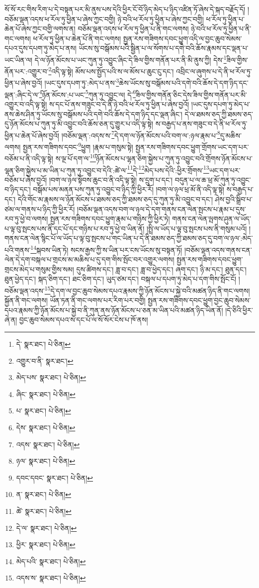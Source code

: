 སོ་སོ་རང་གིས་རིག་པ་དེ་བསྟན་པར་མི་ནུས་པས་དེའི་ཕྱིར་ངོ་བོ་ཉིད་མེད་པ་ཉིད་འཛིན་ཏོ་ཞེས་དེ་སྐད་བརྗོད་དོ། །བཅོམ་ལྡན་འདས་ཕ་རོལ་ཏུ་ཕྱིན་པ་ཞེས་ཀྱང་བགྱི། ཉེ་བའི་ཕ་རོལ་ཏུ་ཕྱིན་པ་ཞེས་ཀྱང་བགྱི། ཕ་རོལ་ཏུ་ཕྱིན་པ་ཆེན་པོ་ཞེས་ཀྱང་བགྱི་ལགས་ན། བཅོམ་ལྡན་འདས་ཕ་རོལ་ཏུ་ཕྱིན་པ་ནི་གང་ལགས། ཉེ་བའི་ཕ་རོལ་ཏུ་ཕྱིན་པ་ནི་གང་ལགས། ཕ་རོལ་ཏུ་ཕྱིན་པ་ཆེན་པོ་ནི་གང་ལགས། སྤྱན་རས་གཟིགས་དབང་ཕྱུག་འདི་ལ་བྱང་ཆུབ་སེམས་དཔའ་དུས་དཔག་ཏུ་མེད་པ་ནས། ཡོངས་སུ་བསྒོམས་པའི་སྦྱིན་པ་ལ་སོགས་པ་དགེ་བའི་ཆོས་རྣམས་དང་ལྡན་པ་ཡང་ཡིན་ལ། དེ་ལ་ཉོན་མོངས་པ་ཡང་ཀུན་ཏུ་འབྱུང་ཞིང་དེ་ཟིལ་གྱིས་གནོན་པར་ནི་མི་ནུས་ཀྱི། དེས་\footnote{དེ་  སྣར་ཐང་།  པེ་ཅིན། }ཟིལ་གྱིས་ནོན་པར་:འགྱུར་བ་\footnote{འགྱུར་བ་ནི་  སྣར་ཐང་། }འདི་ལྟ་སྟེ། མོས་པས་སྤྱོད་པའི་ས་ལ་མོས་པ་ཆུང་ངུ་དང་། འབྲིང་ལ་ཞུགས་པ་དེ་ནི་ཕ་རོལ་ཏུ་ཕྱིན་པ་ཞེས་བྱའོ། །ཡང་དུས་དཔག་ཏུ་:མེད་པ་ནས་\footnote{མེད་པས་  སྣར་ཐང་།  པེ་ཅིན། }ཆེས་ཡོངས་སུ་བསྒོམས་པའི་དགེ་བའི་ཆོས་དེ་དག་ཉིད་དང་ལྡན་:ཞིང་དེ་ལ་\footnote{ཞིང་  སྣར་ཐང་།  པེ་ཅིན། }ཉོན་མོངས་:པ་ཡང་\footnote{པ་  སྣར་ཐང་།  པེ་ཅིན། }ཀུན་ཏུ་འབྱུང་ལ། དེ་\footnote{དེས་  སྣར་ཐང་།  པེ་ཅིན། }ཟིལ་གྱིས་གནོན་ཅིང་དེས་ཟིལ་གྱིས་གནོན་པར་མི་འགྱུར་བ་འདི་ལྟ་སྟེ། ས་དང་པོ་ནས་གཟུང་བ་དེ་ནི་ཉེ་བའི་ཕ་རོལ་ཏུ་ཕྱིན་པ་ཞེས་བྱའོ། །ཡང་དུས་དཔག་ཏུ་མེད་པ་ནས་ཆེས་ཤིན་ཏུ་ཡོངས་སུ་བསྒོམས་པའི་དགེ་བའི་ཆོས་དེ་དག་ཉིད་དང་ལྡན་ཞིང་། དེ་ལ་ཐམས་ཅད་ཀྱི་ཐམས་ཅད་དུ་ཉོན་མོངས་པ་ཀུན་ཏུ་མི་འབྱུང་བའི་ཆོས་ཅན་དུ་གྱུར་པ་འདི་ལྟ་སྟེ། ས་བརྒྱད་པ་ནས་གཟུང་བ་དེ་ནི་ཕ་རོལ་ཏུ་ཕྱིན་པ་ཆེན་པོ་ཞེས་བྱའོ། །བཅོམ་ལྡན་:འདས་ས་\footnote{འདས་  སྣར་ཐང་།  པེ་ཅིན། }དེ་དག་ལ་ཉོན་མོངས་པའི་བག་ལ་:ཉལ་རྣམ་པ་\footnote{ཉལ་  སྣར་ཐང་།  པེ་ཅིན། }དུ་མཆིས་ལགས། སྤྱན་རས་གཟིགས་དབང་\footnote{དབང་དབང་  སྣར་ཐང་།  པེ་ཅིན། }ཕྱུག །རྣམ་པ་གསུམ་སྟེ། སྤྱན་རས་གཟིགས་དབང་ཕྱུག་གྲོགས་ཡང་དག་པར་བཅོམ་པ་ནི་འདི་ལྟ་སྟེ། ས་ལྔ་པོ་དག་ལ་\footnote{ན་  སྣར་ཐང་།  པེ་ཅིན། }ཉོན་མོངས་པ་ལྷན་ཅིག་སྐྱེས་པ་ཀུན་ཏུ་འབྱུང་བའི་གྲོགས་ཉོན་མོངས་པ་ལྷན་ཅིག་སྐྱེས་པ་མ་ཡིན་པ་ཀུན་ཏུ་འབྱུང་བ་དེའི་:ཚེ་ལ་\footnote{ཚེ་  སྣར་ཐང་།  པེ་ཅིན། }དེ་\footnote{དེ་ལ་  སྣར་ཐང་།  པེ་ཅིན། }མེད་པས་དེའི་:ཕྱིར་གྲོགས་\footnote{ཕྱིར་  སྣར་ཐང་།  པེ་ཅིན། }ཡང་དག་པར་བཅོམ་པ་ཞེས་བྱའོ། །བག་ལ་ཉལ་སྟོབས་ཆུང་བ་ནི་འདི་ལྟ་སྟེ། ས་དྲུག་པ་དང་། བདུན་པ་ལ་ཆ་ཕྲ་མོ་ཀུན་ཏུ་འབྱུང་བ་ཉིད་དང་། བསྒོམ་པས་མནན་པས་ཀུན་ཏུ་འབྱུང་བ་ཉིད་ཀྱི་ཕྱིར་རོ། །བག་ལ་ཉལ་ཕྲ་མོ་ནི་འདི་ལྟ་སྟེ། ས་བརྒྱད་པ་དང་། དེའི་གོང་མ་རྣམས་ལ་ཉོན་མོངས་པ་ཐམས་ཅད་ཀྱི་ཐམས་ཅད་དུ་ཀུན་ཏུ་མི་འབྱུང་བ་དང་། ཤེས་བྱའི་སྒྲིབ་པ་ཙམ་ལ་གནས་པ་ཉིད་ཀྱི་ཕྱིར་རོ། །བཅོམ་ལྡན་འདས་བག་ལ་ཉལ་དེ་དག་གནས་ངན་ལེན་སྤངས་པ་རྣམ་པ་དུས་རབ་ཏུ་ཕྱེ་བ་ལགས། སྤྱན་རས་གཟིགས་དབང་ཕྱུག་རྣམ་པ་གཉིས་ཀྱི་ཕྱིར་ཏེ། གནས་ངན་ལེན་ལྤགས་ཤུན་ལ་ཡོད་པ་ལྟ་བུ་སྤངས་པས་ནི་དང་པོ་དང་གཉིས་པ་རབ་ཏུ་ཕྱེ་བ་ཡིན་ནོ། །སྤྲི་ལ་ཡོད་པ་ལྟ་བུ་སྤངས་པས་ནི་གསུམ་པའོ། །གནས་ངན་ལེན་སྙིང་པོ་ལ་ཡོད་པ་ལྟ་བུ་སྤངས་པ་གང་ཡིན་པ་དེ་ནི་ཐམས་ཅད་ཀྱི་ཐམས་ཅད་དུ་བག་ལ་ཉལ་:མེད་པའི་གནས་\footnote{མེད་པའི་  སྣར་ཐང་།  པེ་ཅིན། }སྐབས་ཡིན་ཏེ། སངས་རྒྱས་ཀྱི་ས་ཡིན་པར་ངས་ཡོངས་སུ་བསྟན་ཏོ། །བཅོམ་ལྡན་འདས་གནས་ངན་ལེན་དེ་དག་བསྐལ་པ་གྲངས་མ་མཆིས་པ་དུ་དག་གིས་སྤོང་བར་འགྱུར་ལགས། སྤྱན་རས་གཟིགས་དབང་ཕྱུག་གྲངས་མེད་པ་གསུམ་གྱིས་སམ། དུས་ཚིགས་དང་། ཟླ་བ་དང་། ཟླ་བ་ཕྱེད་དང་། ཞག་དང་། ཉི་མ་དང་། ཐུན་དང་། ཐུན་ཕྱེད་དང་། སྐད་ཅིག་དང་། ཐང་ཅིག་དང་། ཡུད་ཙམ་དང་། བསྐལ་པ་དཔག་ཏུ་མེད་པ་དག་གིས་སྤོང་ངོ། །བཅོམ་ལྡན་འདས་\footnote{འདས་ས་  སྣར་ཐང་།  པེ་ཅིན། }དེ་དག་ལ་བྱང་ཆུབ་སེམས་དཔའ་རྣམས་ཀྱི་ཉོན་མོངས་པ་སྐྱེ་བའི་མཚན་ཉིད་ནི་གང་ལགས། སྐྱོན་ནི་གང་ལགས། ཡོན་ཏན་ནི་གང་ལགས་པར་རིག་པར་བགྱི། སྤྱན་རས་གཟིགས་དབང་ཕྱུག་བྱང་ཆུབ་སེམས་དཔའ་རྣམས་ཀྱི་ཉོན་མོངས་པ་སྐྱེ་བ་ནི་ཀུན་ནས་ཉོན་མོངས་པ་ཅན་མ་ཡིན་པའི་མཚན་ཉིད་ཡིན་ནོ། །དེ་ཅིའི་ཕྱིར་ཞེ་ན། བྱང་ཆུབ་སེམས་དཔའ་ས་དང་པོ་ལ་སོ་སོར་ངེས་པ་ཁོ་ནས། 